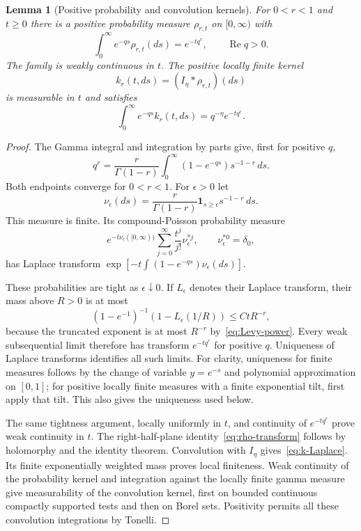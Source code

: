 \documentclass[11pt,a4paper]{article}
\numberwithin{equation}{section}
\newtheorem{lemma}[theorem]{Lemma}
\theoremstyle{definition}
\theoremstyle{remark}
\begin{document}
\begin{lemma}[Positive probability and convolution kernels]\label{lem:positive-kernel}
For $0<r<1$ and $t\ge0$ there is a positive probability measure $\rho_{r,t}$ on $[0,\infty)$ with
\begin{equation}\label{eq:rho-transform}
 \int_0^\infty e^{-qs}\rho_{r,t}(ds)=e^{-tq^r},
 \qquad \operatorname{Re}q>0.
\end{equation}
The family is weakly continuous in $t$. The positive locally finite kernel
\begin{equation}\label{eq:k-definition}
 k_r(t,ds)=(I_\eta*\rho_{r,t})(ds)
\end{equation}
is measurable in $t$ and satisfies
\begin{equation}\label{eq:k-Laplace}
 \int_0^\infty e^{-qs}k_r(t,ds)=q^{-\eta}e^{-tq^r}.
\end{equation}
\end{lemma}
\begin{proof}
The Gamma integral and integration by parts give, first for positive $q$,
\begin{equation}\label{eq:Levy-power}
 q^r=\frac r{\Gamma(1-r)}
      \int_0^\infty(1-e^{-qs})s^{-1-r}\,ds.
\end{equation}
Both endpoints converge for $0<r<1$. For $\epsilon>0$ let
\[
 \nu_\epsilon(ds)=\frac r{\Gamma(1-r)}
           \boldsymbol1_{s\ge\epsilon}s^{-1-r}\,ds.
\]
This measure is finite. Its compound-Poisson probability measure
\[
 e^{-t\nu_\epsilon([0,\infty))}
 \sum_{j=0}^\infty\frac{t^j}{j!}\nu_\epsilon^{*j},
 \qquad \nu_\epsilon^{*0}=\delta_0,
\]
has Laplace transform
$\exp[-t\int(1-e^{-qs})\nu_\epsilon(ds)]$.

These probabilities are tight as $\epsilon\downarrow0$. If $L_\epsilon$ denotes their Laplace transform, their mass above $R>0$ is at most
\[
 (1-e^{-1})^{-1}(1-L_\epsilon(1/R))
 \le C tR^{-r},
\]
because the truncated exponent is at most $R^{-r}$ by~\eqref{eq:Levy-power}. Every weak subsequential limit therefore has transform $e^{-tq^r}$ for positive $q$. Uniqueness of Laplace transforms identifies all such limits. For clarity, uniqueness for finite measures follows by the change of variable $y=e^{-s}$ and polynomial approximation on $[0,1]$; for positive locally finite measures with a finite exponential tilt, first apply that tilt. This also gives the uniqueness used below.

The same tightness argument, locally uniformly in $t$, and continuity of $e^{-tq^r}$ prove weak continuity in $t$. The right-half-plane identity~\eqref{eq:rho-transform} follows by holomorphy and the identity theorem. Convolution with $I_\eta$ gives~\eqref{eq:k-Laplace}. Its finite exponentially weighted mass proves local finiteness. Weak continuity of the probability kernel and integration against the locally finite gamma measure give measurability of the convolution kernel, first on bounded continuous compactly supported tests and then on Borel sets. Positivity permits all these convolution integrations by Tonelli.
\end{proof}
\end{document}

